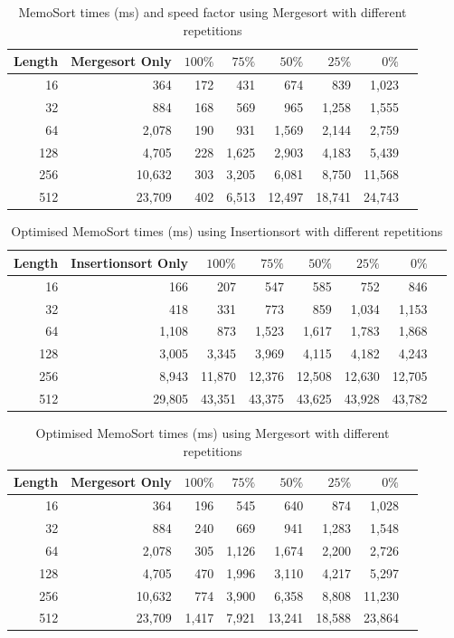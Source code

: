 \documentclass[a4paper,12pt]{article}
\begin{document}
\begin{table}[H]
\centering
\begin{tabular}{|r|r|r|r|r|r|r|r|}   \hline
	{Length} & {Mergesort Only} & {$100\%$} & {$75\%$} & {$50\%$} & {$25\%$} & {$0\%$} \\  \hline
	16 &364&172&431 & 674 & 839 & 1,023\\ 
	32 &884&168&569 & 965& 1,258& 1,555\\ 
	64 &2,078&190 &931&1,569&2,144&2,759\\ 
	128 &4,705&228&1,625&2,903&4,183&5,439\\ 
	256 &10,632&303&3,205&6,081&8,750&11,568\\ 
	512 &23,709& 402&6,513&12,497&18,741&24,743\\  \hline
\end{tabular}
\caption{MemoSort times (ms) and speed factor using Mergesort with different repetitions}
\end{table}


\begin{table}[H]
\centering
\begin{tabular}{|r|r|r|r|r|r|r|r|}   \hline
	{Length} & {Insertionsort Only} & {$100\%$} & {$75\%$} & {$50\%$} & {$25\%$} & {$0\%$} \\  \hline
	16 &166&207&547 & 585 & 752 & 846\\ 
	32 &418&331&773 & 859& 1,034& 1,153\\ 
	64 &1,108&873 &1,523&1,617&1,783& 1,868\\ 
	128 &3,005&3,345&3,969&4,115&4,182 &4,243\\ 
	256 &8,943&11,870&12,376 &12,508&12,630&12,705\\ 
	512 &29,805 & 43,351&43,375 &43,625 &43,928 &43,782\\  \hline
\end{tabular}
\caption{Optimised MemoSort times (ms) using Insertionsort with different repetitions}
\end{table}

\begin{table}[H]
\centering
\begin{tabular}{|r|r|r|r|r|r|r|r|}   \hline
	{Length} & {Mergesort Only} & {$100\%$} & {$75\%$} & {$50\%$} & {$25\%$} & {$0\%$} \\  \hline
	16 &364&196&545 & 640 &874&1,028\\ 
	32 &884&240&669 & 941&1,283&1,548\\ 
	64 &2,078&305 &1,126&1,674&2,200&2,726\\ 
	128 &4,705&470&1,996&3,110&4,217&5,297\\ 
	256 &10,632&774&3,900&6,358&8,808&11,230\\ 
	512 &23,709& 1,417&7,921&13,241&18,588&23,864\\  \hline
\end{tabular}
\caption{Optimised MemoSort times (ms) using Mergesort with different repetitions}
\end{table}
\end{document}

